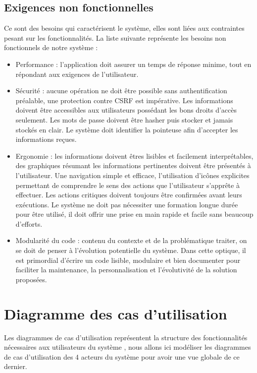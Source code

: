             \subsection{Exigences non fonctionnelles}
                Ce sont des besoins qui caractérisent le système, elles sont liées aux contraintes pesant sur les fonctionnalités. La liste suivante représente les besoins non fonctionnels de notre système :
                \begin{itemize}
                    \item [\textbullet] Performance : l’application doit assurer un temps de réponse minime, tout en répondant aux exigences de l’utilisateur.
                    
                    \item [\textbullet] Sécurité : aucune opération ne doit être possible sans authentification préalable, une protection contre CSRF est impérative. Les informations doivent être accessibles aux utilisateurs possédant les bons droits d’accès seulement. Les mots de passe doivent être hasher puis stocker et jamais stockés en clair. Le système doit identifier la pointeuse afin d’accepter les informations reçues.
                    
                    \item [\textbullet] Ergonomie : les informations doivent êtres lisibles et facilement interprétables, des graphiques résumant les informations pertinentes doivent être présentés à l’utilisateur. Une navigation simple et efficace, l’utilisation d’icônes explicites permettant de comprendre le sens des actions que l’utilisateur s’apprête à effectuer. Les actions critiques doivent toujours être confirmées avant leurs exécutions. Le système ne doit pas nécessiter une formation longue durée pour être utilisé, il doit offrir une prise en main rapide et facile sans beaucoup d’efforts.
                    
                     \item [\textbullet] Modularité du code : contenu du contexte et de la problématique traiter, on se doit de penser à l’évolution potentielle du système. Dans cette optique, il est primordial d’écrire un code lisible, modulaire et bien documenter pour faciliter la maintenance, la personnalisation et l’évolutivité de la solution proposées.
                    
                \end{itemize}
                

\section{Diagramme des cas d'utilisation}
Les diagrammes de cas d’utilisation représentent la structure des fonctionnalités nécessaires aux utilisateurs du système \cite{6}, nous allons ici modéliser les diagrammes de cas d’utilisation des 4 acteurs du système pour avoir une vue globale de ce dernier.

